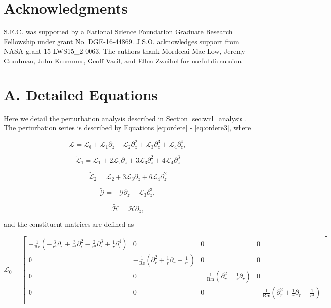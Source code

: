 \documentclass{emulateapj}
\newcommand{\beq}{\begin{equation}}
\newcommand{\eeq}{\end{equation}}
\newcommand\reye{\mathrm{Re}}
\newcommand\reym{\mathrm{Rm}}
\begin{document}
\section{Acknowledgments}
S.E.C. was supported by a National Science Foundation Graduate Research Fellowship under grant No. DGE-16-44869. J.S.O. acknowledges support from NASA grant 15-LWS15\_2-0063. The authors thank Mordecai Mac Low, Jeremy Goodman, John Krommes, Geoff Vasil, and Ellen Zweibel for useful discussion.



\clearpage
\appendix

\section{A. Detailed Equations}\label{app:basic_equations}

Here we detail the perturbation analysis described in Section \ref{sec:wnl_analysis}. The perturbation series is described by Equations \ref{eq:ordere} - \ref{eq:ordere3}, where 

\beq
\mathcal{L} = \mathcal{L}_0 + \mathcal{L}_1 \partial_z + \mathcal{L}_2 \partial_z^2 + \mathcal{L}_3 \partial_z^3 + \mathcal{L}_4 \partial_z^4,
\eeq

\beq
\widetilde{\mathcal{L}}_1 =  \mathcal{L}_1 + 2\mathcal{L}_2\partial_z + 3\mathcal{L}_3\partial_z^2 + 4\mathcal{L}_4\partial_z^3
\eeq

\beq
\widetilde{\mathcal{L}}_2 = \mathcal{L}_2 + 3\mathcal{L}_3\partial_z + 6\mathcal{L}_4\partial_z^2
\eeq

\beq
\widetilde{\mathcal{G}} = - \mathcal{G} \partial_z - \mathcal{L}_3 \partial_z^3,
\eeq

\beq
\widetilde{\mathcal{H}} = \mathcal{H} \partial_z,
\eeq

and the constituent matrices are defined as 

\beq
\mathcal{L}_0 = \left[\begin{matrix}
-\frac{1}{\reye} (-\frac{3}{r^4} \partial_r + \frac{3}{r^3}\partial_r^2 - \frac{2}{r^2}\partial_r^3 + \frac{1}{r}\partial_r^4) & 0 & 0 & 0 \\
0 & -\frac{1}{\reye} (\partial_r^2 + \frac{1}{r}\partial_r - \frac{1}{r^2}) & 0 & 0 \\
0 & 0 & -\frac{1}{\reym} (\partial_r^2 - \frac{1}{r} \partial_r) & 0 \\
0 & 0 & 0 & -\frac{1}{\reym} (\partial_r^2 + \frac{1}{r}\partial_r - \frac{1}{r^2}) \\
\end{matrix}\right]
\eeq
\end{document}
